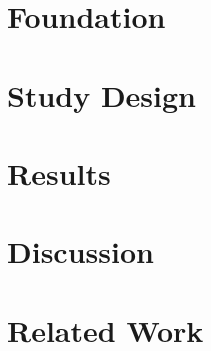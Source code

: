 
\newcommand{\todo}[1]{\textit{\textbf{\textcolor{red}{[TODO: #1]}}}}

\section{Foundation}
\label{cha:Foundation}



\section{Study Design}
\label{cha:StudyDesign}


\section{Results}
\label{cha:Results}


\section{Discussion}
\label{cha:Discussion}


\section{Related Work}
\label{cha:RelatedWork}
